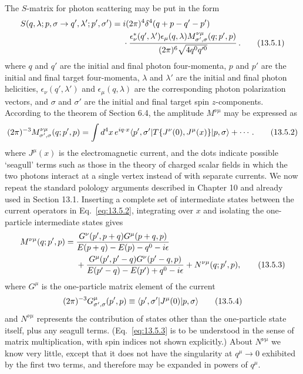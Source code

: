 The $S$-matrix for photon scattering may be put in the form
\begin{align}
S(q,\lambda;p,\sigma\to q',\lambda';p',\sigma')={}&i(2\pi)^4
\delta^4(q+p-q'-p')\notag\\
&\cdot\frac{\epsilon^*_{\nu}(q',\lambda')\epsilon_{\mu}(q,\lambda)
M^{\nu\mu}_{\sigma',\sigma}(q;p',p)}
{(2\pi)^6\sqrt{4q^0q'^0}}\,.
\tag{13.5.1}\label{eq:13.5.1}
\end{align}
where $q$ and $q'$ are the initial and final photon four-momenta, $p$ and $p'$
are the initial and final target four-momenta, $\lambda$ and $\lambda'$ are the initial and
final photon helicities, $\epsilon_\nu(q',\lambda')$ and $\epsilon_\mu(q,\lambda)$ are the corresponding photon
polarization vectors, and $\sigma$ and $\sigma'$ are the initial and final target spin
$z$-components. According to the theorem of Section 6.4, the amplitude
$M^{\nu\mu}$ may be expressed as
\begin{equation}
(2\pi)^{-3}M^{\nu\mu}_{\sigma',\sigma}(q;p',p)
=\int d^4x\,e^{iq\cdot x}
\langle p',\sigma'\rvert T\{J^\nu(0),J^\mu(x)\}\lvert p,\sigma\rangle+\cdots.
\tag{13.5.2}\label{eq:13.5.2}
\end{equation}
where $J^\mu(x)$ is the electromagnetic current, and the dots indicate possible
`seagull' terms such as those in the theory of charged scalar fields in
which the two photons interact at a single vertex instead of with separate
currents. We now repeat the standard polology arguments described
in Chapter 10 and already used in Section 13.1. Inserting a complete
set of intermediate states between the current operators in Eq.~\eqref{eq:13.5.2},
integrating over $x$ and isolating the one-particle intermediate states gives
\begin{align}
M^{\nu\mu}(q;p',p)={}&
\frac{G^\nu(p',p+q)G^\mu(p+q,p)}
{E(p+q)-E(p)-q^0-i\epsilon}\notag\\
&+\frac{G^\mu(p',p'-q)G^\nu(p'-q,p)}
{E(p'-q)-E(p')+q^0-i\epsilon}
+N^{\nu\mu}(q;p',p),
\tag{13.5.3}\label{eq:13.5.3}
\end{align}
where $G^\mu$ is the one-particle matrix element of the current
\begin{equation}
(2\pi)^{-3}G^\mu_{\sigma',\sigma}(p',p)
\equiv\langle p',\sigma'\rvert J^\mu(0)\lvert p,\sigma\rangle
\tag{13.5.4}\label{eq:13.5.4}
\end{equation}
and $N^{\nu\mu}$ represents the contribution of states other than the one-particle
state itself, plus any seagull terms. (Eq.~\eqref{eq:13.5.3} is to be understood in
the sense of matrix multiplication, with spin indices not shown explicitly.)
About $N^{\nu\mu}$ we know very little, except that it does not have the singularity
at $q^\mu\to0$ exhibited by the first two terms, and therefore may be expanded
in powers of $q^\mu$.

